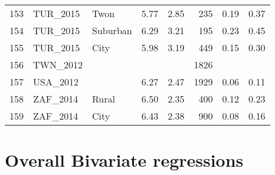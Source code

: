 \documentclass[12pt, titlepage]{article}
\begin{document}
\begin{table}[ht]
\begin{tabular}{rllrrrrr}
		153 & TUR\_2015 & Twon & 5.77 & 2.85 & 235 & 0.19 & 0.37 \\ 
		154 & TUR\_2015 & Suburban & 6.29 & 3.21 & 195 & 0.23 & 0.45 \\ 
		155 & TUR\_2015 & City & 5.98 & 3.19 & 449 & 0.15 & 0.30 \\ 
		156 & TWN\_2012 &  &  &  & 1826 &  &  \\ 
		157 & USA\_2012 &  & 6.27 & 2.47 & 1929 & 0.06 & 0.11 \\ 
		158 & ZAF\_2014 & Rural & 6.50 & 2.35 & 400 & 0.12 & 0.23 \\ 
		159 & ZAF\_2014 & City & 6.43 & 2.38 & 900 & 0.08 & 0.16 \\ 
		\hline
	\end{tabular}
\end{table}

\section{Overall Bivariate regressions}
\end{document}
